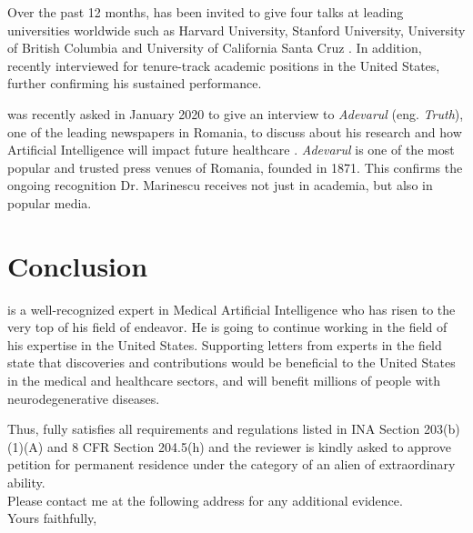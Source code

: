 \documentclass[11pt]{article}
\begin{document}
Over the past 12 months, \dr has been invited to give four talks at leading universities worldwide such as Harvard University, Stanford University, University of British Columbia and University of California Santa Cruz \cite{cv}. In addition, \dr recently interviewed for tenure-track academic positions in the United States, further confirming his sustained performance.\\
 \pg

\dr was recently asked in January 2020 to give an interview to \emph{Adevarul} (eng. \emph{Truth}), one of the leading newspapers in Romania, to discuss about his research and how Artificial Intelligence will impact future healthcare \cite{adevarul}. \emph{Adevarul} is one of the most popular and trusted press venues of Romania, founded in 1871. This confirms the ongoing recognition Dr. Marinescu receives not just in academia, but also in popular media.


\section{Conclusion}

\dr is a well-recognized expert in Medical Artificial Intelligence who has risen to the very top of his field of endeavor. He is going to continue working in the field of his expertise in the United States. Supporting letters from experts in the field state that \drs discoveries and contributions would be beneficial to the United States in the medical and healthcare sectors, and will benefit millions of people with neurodegenerative diseases.

Thus, \dr fully satisfies all requirements and regulations listed in INA Section 203(b)(1)(A) and 8 CFR Section 204.5(h) and the reviewer is kindly asked to approve \drs petition for permanent residence under the category of an alien of extraordinary ability.\\

Please contact me at the following address for any additional evidence.\\

Yours faithfully,
\end{document}
